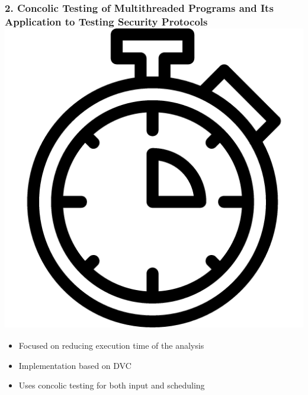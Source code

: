 \documentclass{beamer}
\begin{document}
	\begin{frame}
		\frametitle{2. Concolic Testing of Multithreaded Programs and	Its Application to Testing Security Protocols \cite{base4} \includegraphics[scale=0.025]{clock}}
		
		\begin{itemize}
			\item Focused on reducing execution time of the analysis
			\item Implementation based on DVC
			\item Uses concolic testing for both input and scheduling
		\end{itemize}
	\end{frame}
	
\end{document}
